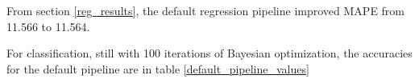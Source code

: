 \documentclass[12pt, letterpaper]{article}
\begin{document}
From section \ref{reg_results}, the default regression pipeline improved MAPE from 11.566 to 11.564.

For classification, still with 100 iterations of Bayesian optimization, the accuracies for the default pipeline are in table \ref{default_pipeline_values}

\begin{table}[H]
\centering
\caption{Default pipeline values - 1st row: tree, 2nd row: forest}
\label{default_pipeline_values}
\end{table}
\end{document}

